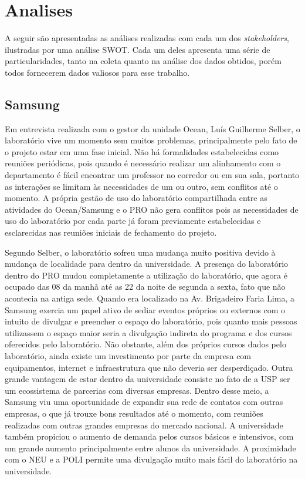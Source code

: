 \chapter{Analises}
\label{cha:analises}

A seguir são apresentadas as análises realizadas com cada um dos \textit{stakeholders}, ilustradas por uma análise SWOT. Cada um deles apresenta uma série de particularidades, tanto na coleta quanto na análise dos dados obtidos, porém todos fornecerem dados valiosos para esse trabalho.

\section{Samsung}

Em entrevista realizada com o gestor da unidade Ocean, Luís Guilherme Selber, o laboratório vive um momento sem muitos problemas, principalmente pelo fato de o projeto estar em uma fase inicial. Não há formalidades estabelecidas como reuniões periódicas, pois quando é necessário realizar um alinhamento com o departamento é fácil encontrar um professor no corredor ou em sua sala, portanto as interações se limitam às necessidades de um ou outro, sem conflitos até o momento. A própria gestão de uso do laboratório compartilhada entre as atividades do Ocean/Samsung e o PRO não gera conflitos pois as necessidades de uso do laboratório por cada parte já foram previamente estabelecidas e esclarecidas nas reuniões iniciais de fechamento do projeto.

Segundo Selber, o laboratório sofreu uma mudança muito positiva devido à mudança de localidade para dentro da universidade. A presença do laboratório dentro do PRO mudou completamente a utilização do laboratório, que agora é ocupado das 08 da manhã até as 22 da noite de segunda a sexta, fato que não acontecia na antiga sede. Quando era localizado na Av. Brigadeiro Faria Lima, a Samsung exercia um papel ativo de sediar eventos próprios ou externos com o intuito de divulgar e preencher o espaço do laboratório, pois quanto mais pessoas utilizassem o espaço maior seria a divulgação indireta do programa e dos cursos oferecidos pelo laboratório. Não obstante, além dos próprios cursos dados pelo laboratório, ainda existe um investimento por parte da empresa com equipamentos, internet e infraestrutura que não deveria ser desperdiçado. Outra grande vantagem de estar dentro da universidade consiste no fato de a USP ser um ecossistema de parcerias com diversas empresas. Dentro desse meio, a Samsung viu uma oportunidade de expandir sua rede de contatos com outras empresas, o que já trouxe bons resultados até o momento, com reuniões realizadas com outras grandes empresas do mercado nacional. A universidade também propiciou o aumento de demanda pelos cursos básicos e intensivos, com um grande aumento principalmente entre alunos da universidade. A proximidade com o NEU e a POLI permite uma divulgação muito mais fácil do laboratório na universidade.

